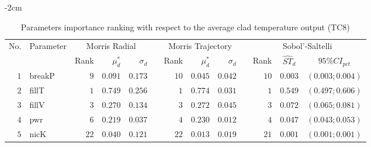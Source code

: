\begin{table*}[!htbp]\centering
{}
\begin{adjustwidth*}{}{-2cm}
\caption{Parameters importance ranking with respect to the average clad temperature output (TC$8$)}
\label{tab:app_screening_tc8_average}
\begin{tabular}{@{}rlrrrrrrrrrcc@{}}\toprule
\multirow{2}{*}{\footnotesize{No.}} & \multirow{2}{*}{\footnotesize{Parameter}} & \multicolumn{3}{c}{\footnotesize{Morris Radial}} & \phantom{a} & \multicolumn{3}{c}{\footnotesize{Morris Trajectory}}  &\phantom{a}& \multicolumn{3}{c}{\footnotesize{Sobol'-Saltelli}}                               \\             
                                                                                  \cmidrule{3-5}                                                   \cmidrule{7-9}                                                      \cmidrule{11-13}
                                    &                                           & \footnotesize{Rank}   & $\mu^*_d$ & $\sigma_d$   &             & \footnotesize{Rank} & $\mu^*_d$ & $\sigma_d$          &           & \footnotesize{Rank} & \footnotesize{$\hat{ST}_d$} & \footnotesize{$95\%CI_{pct}$}\\ \midrule
\footnotesize{$1 $} & \footnotesize{breakP   } & \footnotesize{$9 $} & \footnotesize{$0.091$} & \footnotesize{$0.173$} && \footnotesize{$10$} & \footnotesize{$0.045$} & \footnotesize{$0.042$} && \footnotesize{$10$} & \footnotesize{$0.003$} & \footnotesize{$(0.003;0.004)$} \\
\footnotesize{$2 $} & \footnotesize{fillT    } & \footnotesize{$1 $} & \footnotesize{$0.749$} & \footnotesize{$0.256$} && \footnotesize{$1 $} & \footnotesize{$0.774$} & \footnotesize{$0.031$} && \footnotesize{$1 $} & \footnotesize{$0.549$} & \footnotesize{$(0.497;0.606)$} \\
\footnotesize{$3 $} & \footnotesize{fillV    } & \footnotesize{$3 $} & \footnotesize{$0.270$} & \footnotesize{$0.134$} && \footnotesize{$3 $} & \footnotesize{$0.272$} & \footnotesize{$0.045$} && \footnotesize{$3 $} & \footnotesize{$0.072$} & \footnotesize{$(0.065;0.081)$} \\
\footnotesize{$4 $} & \footnotesize{pwr      } & \footnotesize{$6 $} & \footnotesize{$0.219$} & \footnotesize{$0.037$} && \footnotesize{$4 $} & \footnotesize{$0.230$} & \footnotesize{$0.012$} && \footnotesize{$4 $} & \footnotesize{$0.047$} & \footnotesize{$(0.043;0.053)$} \\
\footnotesize{$5 $} & \footnotesize{nicK     } & \footnotesize{$22$} & \footnotesize{$0.040$} & \footnotesize{$0.121$} && \footnotesize{$22$} & \footnotesize{$0.013$} & \footnotesize{$0.019$} && \footnotesize{$21$} & \footnotesize{$0.001$} & \footnotesize{$(0.001;0.001)$} \\

\end{tabular}
\end{adjustwidth*}
\end{table*}
